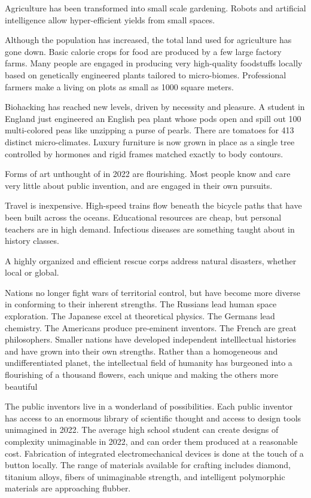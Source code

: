 \documentclass[
	fontsize=10pt, %
	twoside=false, %
	secnumdepth=1, %
]{kaobook}
\begin{document}
Agriculture has been transformed into small scale gardening.
Robots and
artificial intelligence allow hyper-efficient yields from small
spaces.

Although the population has increased, the total land
used for agriculture has gone down.
Basic calorie crops for food are produced by a few large factory farms.
Many people are engaged in producing
very high-quality foodstuffs locally based on genetically engineered
plants tailored to micro-biomes.
Professional farmers make a living on plots as small as 1000 square meters.

Biohacking has reached new levels, driven by necessity and
pleasure.
A student in England just engineered an English pea plant
whose pods open and spill out 100 multi-colored peas like unzipping
a purse of pearls.
There are tomatoes for 413 distinct micro-climates.
Luxury furniture is now grown in place as a single tree
controlled by hormones and rigid frames
matched exactly to body contours.

Forms of art unthought of in 2022 are flourishing.
Most people know and care very little about public invention,
and are engaged in their own pursuits.

Travel is inexpensive. High-speed trains
flow beneath the bicycle paths that have been built across the oceans.
Educational resources are cheap, but personal teachers are in high demand.
Infectious diseases are something taught about in history classes.

A highly organized and efficient rescue corps address natural disasters,
whether local or global.

Nations no longer fight wars of territorial control,
but have become more diverse in conforming to their inherent strengths.
The Russians lead human space exploration. The Japanese excel at
theoretical physics. The Germans lead chemistry. The Americans produce pre-eminent inventors.
The French are great philosophers.
Smaller nations have developed independent intelllectual histories and have
grown into their own strengths.
Rather than a homogeneous and undifferentiated planet,
the intellectual field of humanity has burgeoned into a flourishing
of a thousand flowers, each unique and making the others more
beautiful

The public inventors live in a wonderland of possibilities.
Each public inventor has access to an enormous library of
scientific thought and access to design tools unimagined in 2022.
The average high school student can create designs of
complexity unimaginable in 2022, and can order them
produced at a reasonable cost.
Fabrication of integrated electromechanical devices is
done at the touch of a button locally.
The range of materials available for crafting includes
diamond, titanium alloys, fibers of unimaginable strength,
and intelligent polymorphic materials are approaching flubber.
\end{document}
